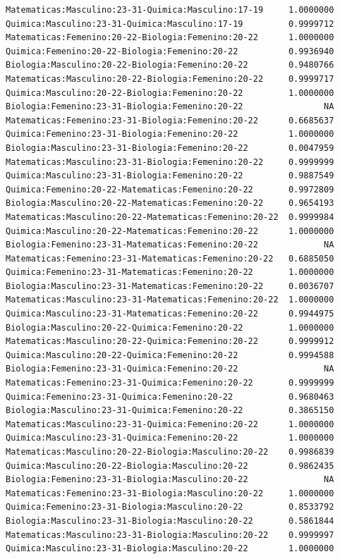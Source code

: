 \documentclass{rapport}
\begin{document}
\begin{itemize}
\begin{verbatim}
Matematicas:Masculino:23-31-Quimica:Masculino:17-19     1.0000000
Quimica:Masculino:23-31-Quimica:Masculino:17-19         0.9999712
Matematicas:Femenino:20-22-Biologia:Femenino:20-22      1.0000000
Quimica:Femenino:20-22-Biologia:Femenino:20-22          0.9936940
Biologia:Masculino:20-22-Biologia:Femenino:20-22        0.9480766
Matematicas:Masculino:20-22-Biologia:Femenino:20-22     0.9999717
Quimica:Masculino:20-22-Biologia:Femenino:20-22         1.0000000
Biologia:Femenino:23-31-Biologia:Femenino:20-22                NA
Matematicas:Femenino:23-31-Biologia:Femenino:20-22      0.6685637
Quimica:Femenino:23-31-Biologia:Femenino:20-22          1.0000000
Biologia:Masculino:23-31-Biologia:Femenino:20-22        0.0047959
Matematicas:Masculino:23-31-Biologia:Femenino:20-22     0.9999999
Quimica:Masculino:23-31-Biologia:Femenino:20-22         0.9887549
Quimica:Femenino:20-22-Matematicas:Femenino:20-22       0.9972809
Biologia:Masculino:20-22-Matematicas:Femenino:20-22     0.9654193
Matematicas:Masculino:20-22-Matematicas:Femenino:20-22  0.9999984
Quimica:Masculino:20-22-Matematicas:Femenino:20-22      1.0000000
Biologia:Femenino:23-31-Matematicas:Femenino:20-22             NA
Matematicas:Femenino:23-31-Matematicas:Femenino:20-22   0.6885050
Quimica:Femenino:23-31-Matematicas:Femenino:20-22       1.0000000
Biologia:Masculino:23-31-Matematicas:Femenino:20-22     0.0036707
Matematicas:Masculino:23-31-Matematicas:Femenino:20-22  1.0000000
Quimica:Masculino:23-31-Matematicas:Femenino:20-22      0.9944975
Biologia:Masculino:20-22-Quimica:Femenino:20-22         1.0000000
Matematicas:Masculino:20-22-Quimica:Femenino:20-22      0.9999912
Quimica:Masculino:20-22-Quimica:Femenino:20-22          0.9994588
Biologia:Femenino:23-31-Quimica:Femenino:20-22                 NA
Matematicas:Femenino:23-31-Quimica:Femenino:20-22       0.9999999
Quimica:Femenino:23-31-Quimica:Femenino:20-22           0.9680463
Biologia:Masculino:23-31-Quimica:Femenino:20-22         0.3865150
Matematicas:Masculino:23-31-Quimica:Femenino:20-22      1.0000000
Quimica:Masculino:23-31-Quimica:Femenino:20-22          1.0000000
Matematicas:Masculino:20-22-Biologia:Masculino:20-22    0.9986839
Quimica:Masculino:20-22-Biologia:Masculino:20-22        0.9862435
Biologia:Femenino:23-31-Biologia:Masculino:20-22               NA
Matematicas:Femenino:23-31-Biologia:Masculino:20-22     1.0000000
Quimica:Femenino:23-31-Biologia:Masculino:20-22         0.8533792
Biologia:Masculino:23-31-Biologia:Masculino:20-22       0.5861844
Matematicas:Masculino:23-31-Biologia:Masculino:20-22    0.9999997
Quimica:Masculino:23-31-Biologia:Masculino:20-22        1.0000000

\end{verbatim}
\end{itemize}
\end{document}
